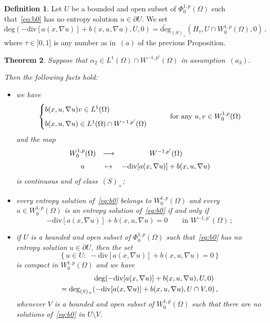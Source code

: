 \documentclass[twoside,reqno]{amsart}
\numberwithin{equation}{section}
\newtheorem{thm}{Theorem}[section]
\theoremstyle{definition}
\newtheorem{defn}[thm]{Definition}
\begin{document}
%
\begin{defn}
\label{defn:degree0}
Let $U$ be a bounded and open subset of $\Phi^{1,p}_0(\Omega)$
such that~\eqref{eq:b0} has no entropy solution  
$u\in\partial U$.
We set
\[
\mathrm{deg}(- \mathrm{div}[a(x,\nabla u)] 
+ b(x,u,\nabla u),U,0)
= 
\widetilde{\mathrm{deg}}_{(S)_+}(H_{\overline{\tau}},
U\cap W^{1,p}_0(\Omega),0)\,,
\]
where $\overline{\tau}\in]0,1]$ is any number as
in~$(a)$ of the previous Proposition.
\end{defn}
%
\begin{thm}
\label{thm:consistency0}
Suppose that 
$\alpha_2\in L^1(\Omega)\cap W^{-1,p'}(\Omega)$ 
in assumption~$(a_3)$.
\par
Then the following facts hold:
\begin{itemize}
\item[$(a)$]
we have
\[
\begin{cases}
b(x,u,\nabla u)v\in L^1(\Omega) \\
\noalign{\medskip}
b(x,u,\nabla u)\in L^1(\Omega)\cap W^{-1,p'}(\Omega) 
\end{cases}
\qquad\text{for any $u,v\in W^{1,p}_0(\Omega)$}
\]
and the map
\[
\begin{array}{ccc}
W^{1,p}_0(\Omega) & \longrightarrow & W^{-1,p'}(\Omega) \\
\noalign{\medskip}
u & \mapsto & -\mathrm{div}[a(x,\nabla u)]+b(x,u,\nabla u)
\end{array}
\]
is continuous and of class~$(S)_+$;
\item[$(b)$]
every entropy solution of~\eqref{eq:b0} belongs to 
$W^{1,p}_0(\Omega)$ and every $u\in W^{1,p}_0(\Omega)$
is an entropy solution of~\eqref{eq:b0} if and only if
\[
- \mathrm{div}[a(x,\nabla u)] + b(x,u,\nabla u)=0
\qquad\text{in $W^{-1,p'}(\Omega)$}\,;
\]
\item[$(c)$]
if $U$ is a bounded and open subset of $\Phi^{1,p}_0(\Omega)$
such that~\eqref{eq:b0} has no entropy solution  
$u\in\partial U$, then the set
\[
\left\{u\in U:\,\,
- \mathrm{div}[a(x,\nabla u)] + b(x,u,\nabla u)=0\right\}
\]
is compact in $W^{1,p}_0(\Omega)$ and we have
\begin{multline*}
\null\qquad\qquad
\mathrm{deg}(- \mathrm{div}[a(x,\nabla u)] 
+ b(x,u,\nabla u),U,0) \\
= \mathrm{deg}_{(S)_+}(- \mathrm{div}[a(x,\nabla u)] 
+ b(x,u,\nabla u),U\cap V,0)\,,
\end{multline*}
whenever $V$ is a bounded and open subset of $W^{1,p}_0(\Omega)$
such that there are no solutions of~\eqref{eq:b0}
in $U\setminus V$.
\end{itemize}
\end{thm}
\end{document}
